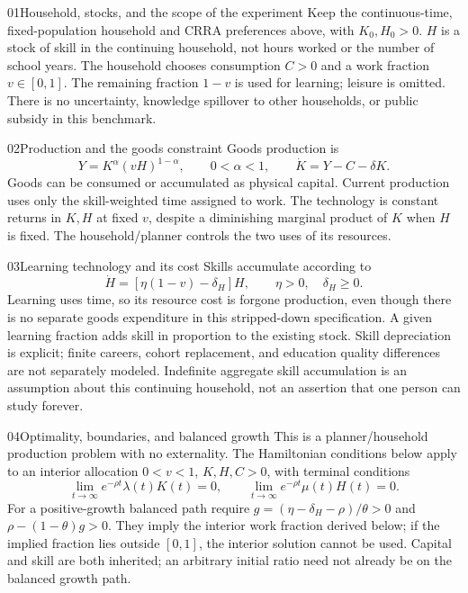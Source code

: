 \begin{modelsetup}[1]
\begin{modelcondition}{01}{Household, stocks, and the scope of the experiment}
Keep the continuous-time, fixed-population household and CRRA preferences
above, with $K_0,H_0>0$. $H$ is a stock of skill in the continuing household,
not hours worked or the number of school years. The household chooses
consumption $C>0$ and a work fraction $v\in[0,1]$. The remaining fraction
$1-v$ is used for learning; leisure is omitted. There is no uncertainty,
knowledge spillover to other households, or public subsidy in this benchmark.
\end{modelcondition}
\begin{modelcondition}{02}{Production and the goods constraint}
Goods production is
\[
Y=K^\alpha(vH)^{1-\alpha},\qquad 0<\alpha<1,\qquad
\dot K=Y-C-\delta K.
\]
Goods can be consumed or accumulated as physical capital. Current production
uses only the skill-weighted time assigned to work. The technology is constant
returns in $K,H$ at fixed $v$, despite a diminishing marginal product of $K$
when $H$ is fixed. The household/planner controls the two uses of its resources.
\end{modelcondition}
\begin{modelcondition}{03}{Learning technology and its cost}
Skills accumulate according to
\[
\dot H=[\eta(1-v)-\delta_H]H,\qquad \eta>0,\quad\delta_H\geq0.
\]
Learning uses time, so its resource cost is forgone production, even though
there is no separate goods expenditure in this stripped-down specification.
A given learning fraction adds skill in proportion to the existing stock.
Skill depreciation is explicit; finite careers, cohort replacement, and
education quality differences are not separately modeled. Indefinite aggregate
skill accumulation is an assumption about this continuing household, not an
assertion that one person can study forever.
\end{modelcondition}
\begin{modelcondition}{04}{Optimality, boundaries, and balanced growth}
This is a planner/household production problem with no externality. The
Hamiltonian conditions below apply to an interior allocation $0<v<1$,
$K,H,C>0$, with terminal conditions
\[
\lim_{t\to\infty}e^{-\rho t}\lambda(t)K(t)=0,\qquad
\lim_{t\to\infty}e^{-\rho t}\mu(t)H(t)=0.
\]
For a positive-growth balanced path require
$g=(\eta-\delta_H-\rho)/\theta>0$ and
$\rho-(1-\theta)g>0$. They imply the interior work fraction derived below;
if the implied fraction lies outside $[0,1]$, the interior solution cannot
be used. Capital and skill are both inherited; an arbitrary initial ratio
need not already be on the balanced growth path.
\end{modelcondition}
\end{modelsetup}

